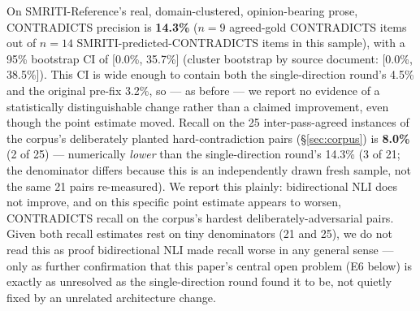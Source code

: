 

On SMRITI-Reference's real, domain-clustered, opinion-bearing prose,
CONTRADICTS precision is \textbf{14.3\%} ($n=9$ agreed-gold CONTRADICTS
items out of $n=14$ SMRITI-predicted-CONTRADICTS items in this sample),
with a 95\% bootstrap CI of [0.0\%, 35.7\%] (cluster bootstrap by source
document: [0.0\%, 38.5\%]). This CI is wide enough to contain both the
single-direction round's 4.5\% and the original pre-fix 3.2\%, so --- as
before --- we report no evidence of a statistically distinguishable
change rather than a claimed improvement, even though the point estimate
moved. Recall on the 25 inter-pass-agreed instances of the corpus's
deliberately planted hard-contradiction pairs (\S\ref{sec:corpus}) is
\textbf{8.0\%} (2 of 25) --- numerically \emph{lower} than the
single-direction round's 14.3\% (3 of 21; the denominator differs because
this is an independently drawn fresh sample, not the same 21 pairs
re-measured). We report this plainly: bidirectional NLI does not improve,
and on this specific point estimate appears to worsen, CONTRADICTS recall
on the corpus's hardest deliberately-adversarial pairs. Given both
recall estimates rest on tiny denominators (21 and 25), we do not read
this as proof bidirectional NLI made recall worse in any general sense
--- only as further confirmation that this paper's central open problem
(E6 below) is exactly as unresolved as the single-direction round found
it to be, not quietly fixed by an unrelated architecture change.

